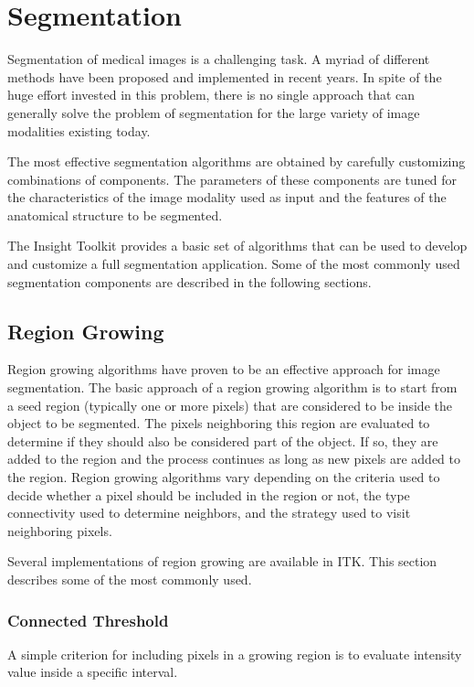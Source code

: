 
\chapter{Segmentation}

Segmentation of medical images is a challenging task. A myriad of different
methods have been proposed and implemented in recent years. In spite of the
huge effort invested in this problem, there is no single approach that can
generally solve the problem of segmentation for the large variety of image
modalities existing today.

The most effective segmentation algorithms are obtained by carefully
customizing combinations of components. The parameters of these components are
tuned for the characteristics of the image modality used as input and the
features of the anatomical structure to be segmented. 

The Insight Toolkit provides a basic set of algorithms that can be used to
develop and customize a full segmentation application. Some of the most
commonly used segmentation components are described in the following
sections.


\section{Region Growing}

Region growing algorithms have proven to be an effective approach for image
segmentation. The basic approach of a region growing algorithm is to start
from a seed region (typically one or more pixels) that are considered to be
inside the object to be segmented. The pixels neighboring this region are
evaluated to determine if they should also be considered part of the
object. If so, they are added to the region and the process continues as long
as new pixels are added to the region.  Region growing algorithms vary
depending on the criteria used to decide whether a pixel should be included
in the region or not, the type connectivity used to determine neighbors, and
the strategy used to visit neighboring pixels.

Several implementations of region growing are available in ITK.  This section
describes some of the most commonly used.

\subsection{Connected Threshold}

A simple criterion for including pixels in a growing region is to evaluate
intensity value inside a specific interval.

